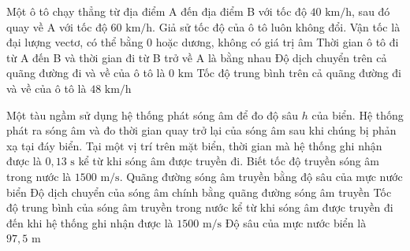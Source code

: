 \begin{ex} Một ô tô chạy thẳng từ địa điểm A đến địa điểm B với tốc độ $40\text{ km/h}$, sau đó quay về A với tốc độ $60\text{ km/h}$. Giả sử tốc độ của ô tô luôn không đổi.
\choiceTF
{Vận tốc là đại lượng vectơ, có thể bằng 0 hoặc dương, không có giá trị âm}
{Thời gian ô tô đi từ A đến B và thời gian đi từ B trở về A là bằng nhau}
{\True Độ dịch chuyển trên cả quãng đường đi và về của ô tô là $0\text{ km}$}
{\True Tốc độ trung bình trên cả quãng đường đi và về của ô tô là $48\text{ km/h}$}
\end{ex}

\begin{ex} Một tàu ngầm sử dụng hệ thống phát sóng âm để đo độ sâu $h$ của biển. Hệ thống phát ra sóng âm và đo thời gian quay trở lại của sóng âm sau khi chúng bị phản xạ tại đáy biển. Tại một vị trí trên mặt biển, thời gian mà hệ thống ghi nhận được là $0{,}13\text{ s}$ kể từ khi sóng âm được truyền đi. Biết tốc độ truyền sóng âm trong nước là $1500\text{ m/s}$.
\choiceTF
{Quãng đường sóng âm truyền bằng độ sâu của mực nước biển}
{Độ dịch chuyển của sóng âm chính bằng quãng đường sóng âm truyền}
{\True Tốc độ trung bình của sóng âm truyền trong nước kể từ khi sóng âm được truyền đi đến khi hệ thống ghi nhận được là $1500\text{ m/s}$}
{\True Độ sâu của mực nước biển là $97{,}5\text{ m}$}
\end{ex}

